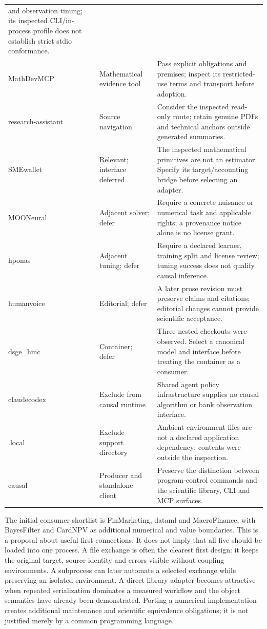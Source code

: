 \begin{longtable}{P{.21\linewidth}P{.23\linewidth}P{.47\linewidth}}
and observation timing; its inspected CLI/in-process profile does not establish
strict stdio conformance. \\
MathDevMCP & Mathematical evidence tool & Pass explicit obligations and
premises; inspect its restricted-use terms and transport before adoption. \\
research-assistant & Source navigation & Consider the inspected read-only
route; retain genuine PDFs and technical anchors outside generated summaries. \\
SMEwallet & Relevant; interface deferred & The inspected mathematical
primitives are not an estimator. Specify its target/accounting bridge before
selecting an adapter. \\
MOONeural & Adjacent solver; defer & Require a concrete nuisance or numerical
task and applicable rights; a provenance notice alone is no license grant. \\
hponas & Adjacent tuning; defer & Require a declared learner, training split
and license review; tuning success does not qualify causal inference. \\
humanvoice & Editorial; defer & A later prose revision must preserve claims
and citations; editorial changes cannot provide scientific acceptance. \\
dsge\_hmc & Container; defer & Three nested checkouts were observed. Select a
canonical model and interface before treating the container as a consumer. \\
claudecodex & Exclude from causal runtime & Shared agent policy infrastructure
supplies no causal algorithm or bank observation interface. \\
.local & Exclude support directory & Ambient environment files are not a
declared application dependency; contents were outside the inspection. \\
causal & Producer and standalone client & Preserve the distinction between
program-control commands and the scientific library, CLI and MCP surfaces. \\
\bottomrule
\end{longtable}

The initial consumer shortlist is FinMarketing, dataml and MacroFinance,
with BayesFilter and CardNPV as additional numerical and value boundaries.
This is a proposal about useful first connections. It does not imply that all
five should be loaded into one process. A file exchange is often the clearest
first design: it keeps the original target, source identity and errors visible
without coupling environments. A subprocess can later automate a selected
exchange while preserving an isolated environment. A direct library adapter
becomes attractive when repeated serialization dominates a measured workflow
and the object semantics have already been demonstrated. Porting a numerical
implementation creates additional maintenance and scientific equivalence
obligations; it is not justified merely by a common programming language.

